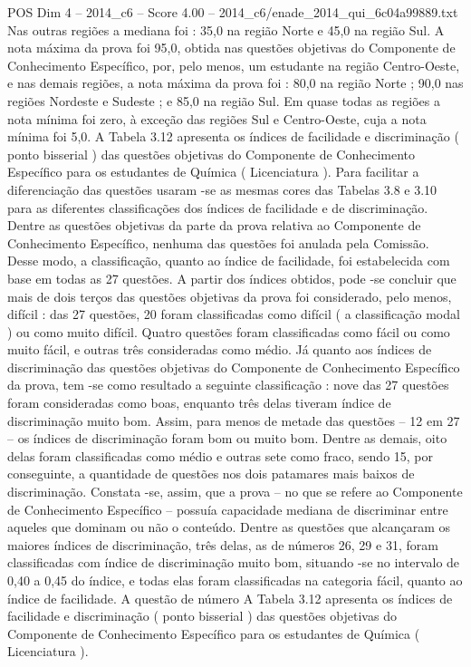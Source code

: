 \begin{textsample}{POS Dim 4 – 2014\_c6 – Score 4.00 – 2014\_c6/enade\_2014\_qui\_6c04a99889.txt}
Nas outras regiões a mediana foi : 35,0 na região Norte e 45,0 na região Sul.
A nota máxima da prova foi 95,0, obtida nas questões objetivas do Componente de Conhecimento Específico, por, pelo menos, um estudante na região Centro-Oeste, e nas demais regiões, a nota máxima da prova foi : 80,0 na região Norte ; 90,0 nas regiões Nordeste e Sudeste ; e 85,0 na região Sul.
Em quase todas as regiões a nota mínima foi zero, à exceção das regiões Sul e Centro-Oeste, cuja a nota mínima foi 5,0.
A Tabela 3.12 apresenta os índices de facilidade e discriminação ( ponto bisserial ) das questões objetivas do Componente de Conhecimento Específico para os estudantes de Química ( Licenciatura ).
Para facilitar a diferenciação das questões usaram -se as mesmas cores das Tabelas 3.8 e 3.10 para as diferentes classificações dos índices de facilidade e de discriminação.
Dentre as questões objetivas da parte da prova relativa ao Componente de Conhecimento Específico, nenhuma das questões foi anulada pela Comissão.
Desse modo, a classificação, quanto ao índice de facilidade, foi estabelecida com base em todas as 27 questões.
A partir dos índices obtidos, pode -se concluir que mais de dois terços das questões objetivas da prova foi considerado, pelo menos, difícil : das 27 questões, 20 foram classificadas como difícil ( a classificação modal ) ou como muito difícil.
Quatro questões foram classificadas como fácil ou como muito fácil, e outras três consideradas como médio.
Já quanto aos índices de discriminação das questões objetivas do Componente de Conhecimento Específico da prova, tem -se como resultado a seguinte classificação : nove das 27 questões foram consideradas como boas, enquanto três delas tiveram índice de discriminação muito bom.
Assim, para menos de metade das questões – 12 em 27 – os índices de discriminação foram bom ou muito bom.
Dentre as demais, oito delas foram classificadas como médio e outras sete como fraco, sendo 15, por conseguinte, a quantidade de questões nos dois patamares mais baixos de discriminação.
Constata -se, assim, que a prova – no que se refere ao Componente de Conhecimento Específico – possuía capacidade mediana de discriminar entre aqueles que dominam ou não o conteúdo.
Dentre as questões que alcançaram os maiores índices de discriminação, três delas, as de números 26, 29 e 31, foram classificadas com índice de discriminação muito bom, situando -se no intervalo de 0,40 a 0,45 do índice, e todas elas foram classificadas na categoria fácil, quanto ao índice de facilidade.
A questão de número A Tabela 3.12 apresenta os índices de facilidade e discriminação ( ponto bisserial ) das questões objetivas do Componente de Conhecimento Específico para os estudantes de Química ( Licenciatura ).

\end{textsample}
